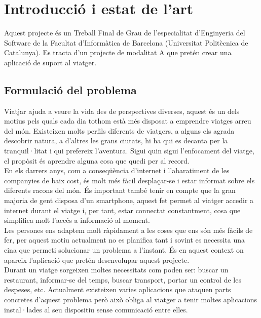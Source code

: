 
\chapter{Introducció i estat de l'art} %

\label{Context} %

Aquest projecte és un Treball Final de Grau de l'especialitat d'Enginyeria del Software de la Facultat d'Informàtica de Barcelona (Universitat Politècnica de Catalunya). Es tracta d'un projecte de modalitat A que pretén crear una aplicació de suport al viatger.


\section{Formulació del problema}

Viatjar ajuda a veure la vida des de perspectives diverses, aquest és un dels motius pels quals cada dia tothom està més disposat a emprendre viatges arreu del món. Existeixen molts perfils diferents de viatgers, a alguns els agrada descobrir natura, a d'altres les grans ciutats, hi ha qui es decanta per la tranquil·litat i qui prefereix l'aventura. Sigui quin sigui l'enfocament del viatge, el propòsit és aprendre alguna cosa que quedi per al record.\\

En els darrers anys, com a conseqüència d'internet i l'abaratiment de les companyies de baix cost, és molt més fàcil desplaçar-se i estar informat sobre els diferents racons del món. És important també tenir en compte que la gran majoria de gent disposa d'un smartphone, aquest fet permet al viatger accedir a internet durant el viatge i, per tant, estar connectat constantment, cosa que simplifica molt l'accés a informació al moment.\\

Les persones ens adaptem molt ràpidament a les coses que ens són més fàcils de fer, per aquest motiu actualment no es planifica tant i sovint es necessita una eina que permeti solucionar un problema a l'instant. És en aquest context on apareix l'aplicació que pretén desenvolupar aquest projecte.\\

Durant un viatge sorgeixen moltes necessitats com poden ser: buscar un restaurant, informar-se del temps, buscar transport, portar un control de les despeses, etc. Actualment existeixen varies aplicacions que ataquen parts concretes d'aquest problema però això obliga al viatger a tenir moltes aplicacions instal·lades al seu dispositiu sense comunicació entre elles.\\

